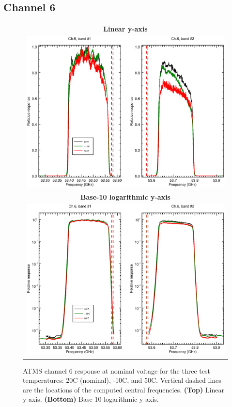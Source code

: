 \subsection{Channel 6}
\begin{figure}[H]
  \label{fig:Tset.ch6_response}
  \centering
  \begin{tabular}{c}
    \hspace{0.75cm}\sffamily\textbf{Linear y-axis} \\
    \includegraphics[scale=0.55]{graphics/srf/Tset/lin/atms_npp-6.eps} \\
    \hspace{0.75cm}\sffamily\textbf{Base-10 logarithmic y-axis} \\
    \includegraphics[scale=0.55]{graphics/srf/Tset/log/atms_npp-6.eps}
  \end{tabular}
  \caption{ATMS channel 6 response at nominal voltage for the three test temperatures: 20\textdegree{}C (nominal), -10\textdegree{}C, and 50\textdegree{}C. Vertical dashed lines are the locations of the computed central frequencies. \textbf{(Top)} Linear y-axis. \textbf{(Bottom)} Base-10 logarithmic y-axis.}
\end{figure}

